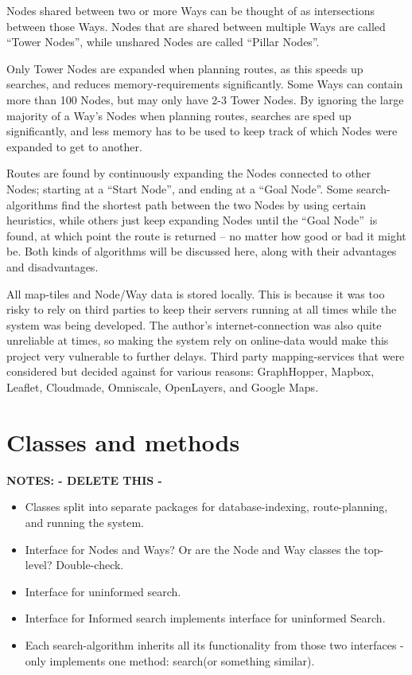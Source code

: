 Nodes shared between two or more Ways can be thought of as intersections between those Ways. Nodes that are shared between multiple Ways are called \textquotedblleft Tower Nodes\textquotedblright, while unshared Nodes are called \textquotedblleft Pillar Nodes\textquotedblright.

Only Tower Nodes are expanded when planning routes, as this speeds up searches, and reduces memory-requirements significantly. Some Ways can contain more than 100 Nodes, but may only have 2-3 Tower Nodes. By ignoring the large majority of a Way's Nodes when planning routes, searches are sped up significantly, and less memory has to be used to keep track of which Nodes were expanded to get to another.

Routes are found by continuously expanding the Nodes connected to other Nodes; starting at a \textquotedblleft Start Node\textquotedblright, and ending at a \textquotedblleft Goal Node\textquotedblright. Some search-algorithms find the shortest path between the two Nodes by using certain heuristics, while others just keep expanding Nodes until the \textquotedblleft Goal Node\textquotedblright~is found, at which point the route is returned -- no matter how good or bad it might be. Both kinds of algorithms will be discussed here, along with their advantages and disadvantages.

All map-tiles and Node/Way data is stored locally. This is because it was too risky to rely on third parties to keep their servers running at all times while the system was being developed. The author's internet-connection was also quite unreliable at times, so making the system rely on online-data would make this project very vulnerable to further delays. Third party mapping-services that were considered but decided against for various reasons: GraphHopper\cite{Graphhopper}, Mapbox\cite{mapbox}, Leaflet\cite{leaflet}, Cloudmade\cite{cloudmade}, Omniscale\cite{omniscale}, OpenLayers\cite{openlayers}, and Google Maps\cite{GoogleMaps}.

\section{Classes and methods}
\textbf{NOTES: - DELETE THIS -}
\begin{itemize}
\item Classes split into separate packages for database-indexing, route-planning, and running the system.
\item Interface for Nodes and Ways? Or are the Node and Way classes the top-level? Double-check.
\item Interface for uninformed search.
\item Interface for Informed search implements interface for uninformed Search.
\item Each search-algorithm inherits all its functionality from those two interfaces - only implements one method: search(or something similar).
\end{itemize}


